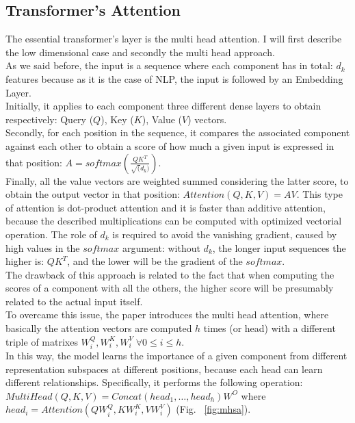 \documentclass[LaM,binding=0.6cm]{sapthesis}
\begin{document}
\subsection{Transformer's Attention}
The essential transformer's layer is the multi head attention. I will first describe the low dimensional case and secondly the multi head approach.\\As we said before, the input is a sequence where each component has in total: $d_k$ features because as it is the case of NLP, the input is followed by an Embedding Layer.\\Initially, it applies to each component three different dense layers to obtain respectively: Query ($Q$), Key ($K$), Value ($V$) vectors.\\Secondly, for each position in the sequence, it compares the associated component against each other to obtain a score of how much a given input is expressed in that position: $A = softmax(\frac{QK^T}{\sqrt(d_k)})$.\\Finally, all the value vectors are weighted summed considering the latter score, to obtain the output vector in that position: $Attention(Q,K,V) = AV$. This type of attention is dot-product attention and it is faster than additive attention, because the described multiplications can be computed with optimized vectorial operation. The role of $d_k$ is required to avoid the vanishing gradient, caused by high values in the $softmax$ argument: without $d_k$, the longer input sequences the higher is: $QK^T$, and the lower will be the gradient of the $softmax$.\\The drawback of this approach is related to the fact that when computing the scores of a component with all the others, the higher score will be presumably related to the actual input itself.\\To overcame this issue, the paper introduces the multi head attention, where basically the attention vectors are computed $h$ times (or head) with a different triple of matrixes $W^{Q}_{i},W^{K}_{i},W^{V}_{i} \; \forall 0\leq i\le h$.\\In this way, the model learns the importance of a given component from different representation subspaces at different positions, because each head can learn different relationships. Specifically, it performs the following operation: $MultiHead(Q,K,V)=Concat(head_1,\dots,head_h)W^O$ where $head_i= Attention(QW_{i}^{Q} , KW_{i}^{K} , VW_{i}^{V} )$ (Fig. ~\ref{fig:mhsa}).
\end{document}
